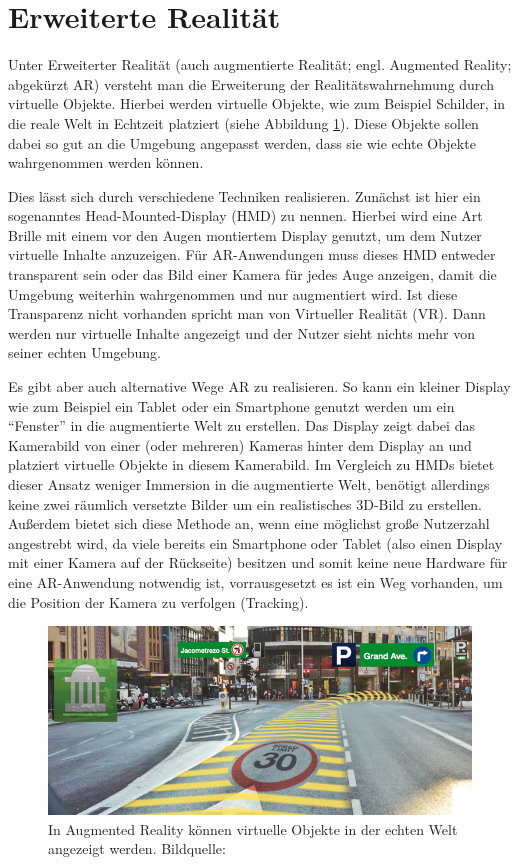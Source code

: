 \documentclass[10pt]{scrartcl}
\begin{document}
\section{Erweiterte Realität}

Unter Erweiterter Realität (auch augmentierte Realität; engl. Augmented Reality; abgekürzt AR) versteht man die Erweiterung der Realitätswahrnehmung durch virtuelle Objekte. Hierbei werden virtuelle Objekte, wie zum Beispiel Schilder, in die reale Welt in Echtzeit platziert (siehe Abbildung \ref{img:ar_signs}). Diese Objekte sollen dabei so gut an die Umgebung angepasst werden, dass sie wie echte Objekte wahrgenommen werden können.

Dies lässt sich durch verschiedene Techniken realisieren. Zunächst ist hier ein sogenanntes Head-Mounted-Display (HMD) zu nennen. Hierbei wird eine Art Brille mit einem vor den Augen montiertem Display genutzt, um dem Nutzer virtuelle Inhalte anzuzeigen. Für AR-Anwendungen muss dieses HMD entweder transparent sein oder das Bild einer Kamera für jedes Auge anzeigen, damit die Umgebung weiterhin wahrgenommen und nur augmentiert wird. Ist diese Transparenz nicht vorhanden spricht man von Virtueller Realität (VR). Dann werden nur virtuelle Inhalte angezeigt und der Nutzer sieht nichts mehr von seiner echten Umgebung.

Es gibt aber auch alternative Wege AR zu realisieren. So kann ein kleiner Display wie zum Beispiel ein Tablet oder ein Smartphone genutzt werden um ein \enquote{Fenster} in die augmentierte Welt zu erstellen. Das Display zeigt dabei das Kamerabild von einer (oder mehreren) Kameras hinter dem Display an und platziert virtuelle Objekte in diesem Kamerabild. Im Vergleich zu HMDs bietet dieser Ansatz weniger Immersion in die augmentierte Welt, benötigt allerdings keine zwei räumlich versetzte Bilder um ein realistisches 3D-Bild zu erstellen. Außerdem bietet sich diese Methode an, wenn eine möglichst große Nutzerzahl angestrebt wird, da viele bereits ein Smartphone oder Tablet (also einen Display mit einer Kamera auf der Rückseite) besitzen und somit keine neue Hardware für eine AR-Anwendung notwendig ist, vorrausgesetzt es ist ein Weg vorhanden, um die Position der Kamera zu verfolgen (Tracking).

\begin{figure}
\centering
\includegraphics[scale=0.55]{images/ar_signs.jpg}
\caption{\label{img:ar_signs}In Augmented Reality können virtuelle Objekte in der echten Welt angezeigt werden. Bildquelle: \cite{arsigns}}
\end{figure}
\end{document}
